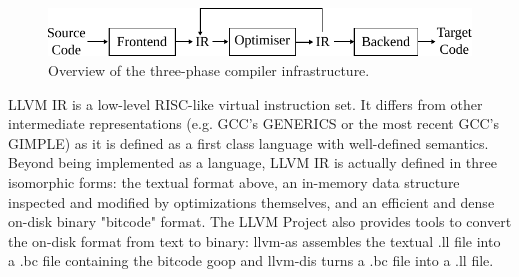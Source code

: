 \begin{figure}[h]
  \centering
  \includegraphics[scale=0.9]{figs/3-phase-compiler.pdf}
  \caption{Overview of the three-phase compiler infrastructure.}
  \label{fig:3-phase-compiler}
\end{figure}




LLVM IR is a low-level RISC-like virtual instruction set.
It differs from other intermediate representations (e.g. GCC's GENERICS or the most recent GCC's GIMPLE) as it is defined as a first class language with well-defined semantics.
Beyond being implemented as a language, LLVM IR is actually defined in three isomorphic forms: the textual format above, an in-memory data structure inspected and modified by optimizations themselves, and an efficient and dense on-disk binary "bitcode" format.
The LLVM Project also provides tools to convert the on-disk format from text to binary: llvm-as assembles the textual .ll file into a .bc file containing the bitcode goop and llvm-dis turns a .bc file into a .ll file.


